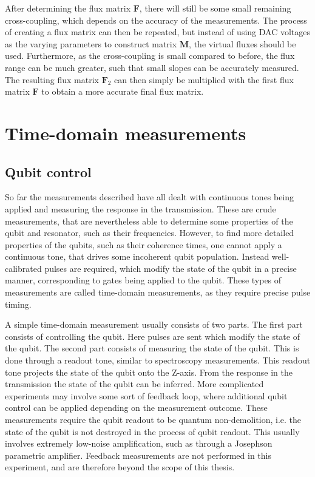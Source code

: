         After determining the flux matrix $\boldsymbol{F}$, there will still be some small remaining cross-coupling, which depends on the accuracy of the measurements. The process of creating a flux matrix can then be repeated, but instead of using DAC voltages as the varying parameters to construct matrix $\boldsymbol{M}$, the virtual fluxes should be used. Furthermore, as the cross-coupling is small compared to before, the flux range can be much greater, such that small slopes can be accurately measured. The resulting flux matrix $\boldsymbol{F}_2$ can then simply be multiplied with the first flux matrix $\boldsymbol{F}$ to obtain a more accurate final flux matrix.

    \section{Time-domain measurements}
      \subsection{Qubit control}
        \label{ssec:qubit control}
        So far the measurements described have all dealt with continuous tones being applied and measuring the response in the transmission. These are crude measurements, that are nevertheless able to determine some properties of the qubit and resonator, such as their frequencies. However, to find more detailed properties of the qubits, such as their coherence times, one cannot apply a continuous tone, that drives some incoherent qubit population. Instead well-calibrated pulses are required, which modify the state of the qubit in a precise manner, corresponding to gates being applied to the qubit. These types of measurements are called time-domain measurements, as they require precise pulse timing.

        A simple time-domain measurement usually consists of two parts. The first part consists of controlling the qubit. Here pulses are sent which modify the state of the qubit. The second part consists of measuring the state of the qubit. This is done through a readout tone, similar to spectroscopy measurements. This readout tone projects the state of the qubit onto the Z-axis. From the response in the transmission the state of the qubit can be inferred. More complicated experiments may involve some sort of feedback loop, where additional qubit control can be applied depending on the measurement outcome. These measurements require the qubit readout to be quantum non-demolition, i.e. the state of the qubit is not destroyed in the process of qubit readout. This usually involves extremely low-noise amplification, such as through a Josephson parametric amplifier. Feedback measurements are not performed in this experiment, and are therefore beyond the scope of this thesis.

